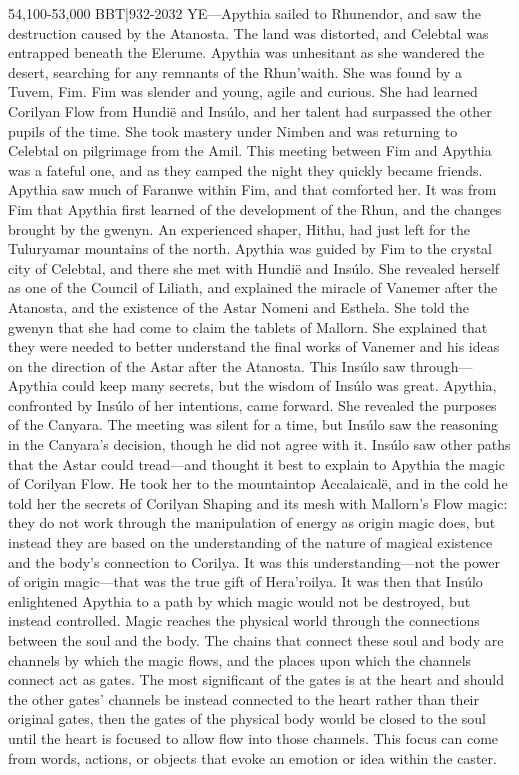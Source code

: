\documentclass[smalldemyvopaper,11pt,twoside,onecolumn,openright,extrafontsizes]{memoir}
\begin{document}
54,100-53,000 BBT|932-2032 YE—Apythia sailed to Rhunendor, and saw the destruction caused by the Atanosta. The land was distorted, and Celebtal was entrapped beneath the Elerume. Apythia was unhesitant as she wandered the desert, searching for any remnants of the Rhun’waith. She was found by a Tuvem, Fim. Fim was slender and young, agile and curious. She had learned Corilyan Flow from Hundië and Insúlo, and her talent had surpassed the other pupils of the time. She took mastery under Nimben and was returning to Celebtal on pilgrimage from the Amil.
This meeting between Fim and Apythia was a fateful one, and as they camped the night they quickly became friends. Apythia saw much of Faranwe within Fim, and that comforted her. It was from Fim that Apythia first learned of the development of the Rhun, and the changes brought by the gwenyn. An experienced shaper, Hithu, had just left for the Tuluryamar mountains of the north. Apythia was guided by Fim to the crystal city of Celebtal, and there she met with Hundië and Insúlo. She revealed herself as one of the Council of Liliath, and explained the miracle of Vanemer after the Atanosta, and the existence of the Astar Nomeni and Esthela. She told the gwenyn that she had come to claim the tablets of Mallorn. She explained that they were needed to better understand the final works of Vanemer and his ideas on the direction of the Astar after the Atanosta. This Insúlo saw through—Apythia could keep many secrets, but the wisdom of Insúlo was great. Apythia, confronted by Insúlo of her intentions, came forward. She revealed the purposes of the Canyara. The meeting was silent for a time, but Insúlo saw the reasoning in the Canyara’s decision, though he did not agree with it. Insúlo saw other paths that the Astar could tread—and thought it best to explain to Apythia the magic of Corilyan Flow. He took her to the mountaintop Accalaicalë, and in the cold he told her the secrets of Corilyan Shaping and its mesh with Mallorn’s Flow magic: they do not work through the manipulation of energy as origin magic does, but instead they are based on the understanding of the nature of magical existence and the body’s connection to Corilya. It was this understanding—not the power of origin magic—that was the true gift of Hera’roilya.
It was then that Insúlo enlightened Apythia to a path by which magic would not be destroyed, but instead controlled. Magic reaches the physical world through the connections between the soul and the body. The chains that connect these soul and body are channels by which the magic flows, and the places upon which the channels connect act as gates. The most significant of the gates is at the heart and should the other gates’ channels be instead connected to the heart rather than their original gates, then the gates of the physical body would be closed to the soul until the heart is focused to allow flow into those channels. This focus can come from words, actions, or objects that evoke an emotion or idea within the caster.
\end{document}

